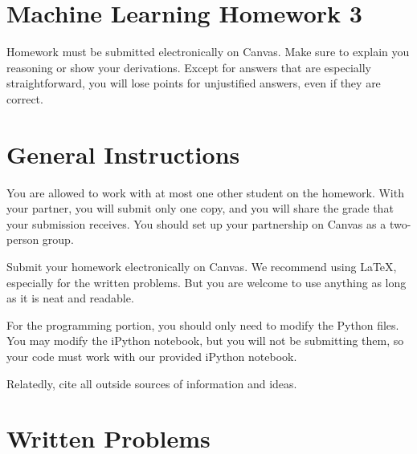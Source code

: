 \documentclass[10pt]{article}
\begin{document}
\section*{Machine Learning Homework 3}

Homework must be submitted electronically on Canvas. Make sure to explain you reasoning or show your derivations. Except for answers that are especially straightforward, you will lose points for unjustified answers, even if they are correct. 

\section*{General Instructions}

You are allowed to work with at most one other student on the homework. With your partner, you will submit only one copy, and you will share the grade that your submission receives. You should set up your partnership on Canvas as a two-person group. 

Submit your homework electronically on Canvas. We recommend using LaTeX, especially for the written problems. But you are welcome to use anything as long as it is neat and readable. 

For the programming portion, you should only need to modify the Python files. You may modify the iPython notebook, but you will not be submitting them, so your code must work with our provided iPython notebook.

Relatedly, cite all outside sources of information and ideas. 

\section*{Written Problems}
\end{document}
